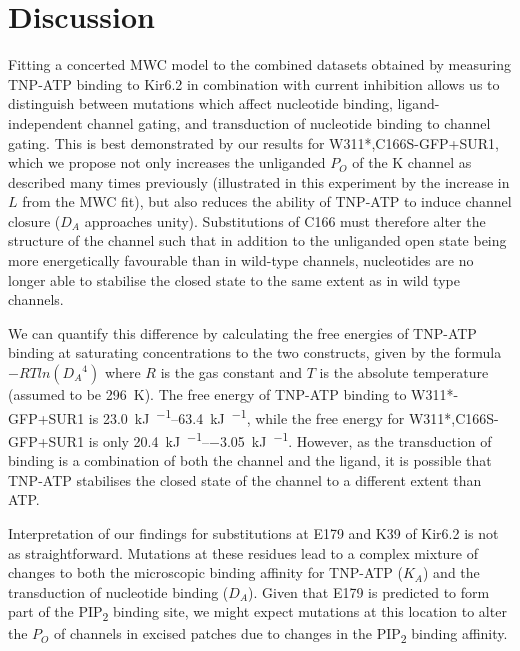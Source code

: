 \section{Discussion}

Fitting a concerted MWC model to the combined datasets obtained by measuring TNP-ATP binding to Kir6.2 in combination with current inhibition allows us to distinguish between mutations which affect nucleotide binding, ligand-independent channel gating, and transduction of nucleotide binding to channel gating.
This is best demonstrated by our results for W311*,C166S-GFP+SUR1, which we propose not only increases the unliganded $P_O$ of the K\ATP{} channel as described many times previously (illustrated in this experiment by the increase in $L$ from the MWC fit), but also reduces the ability of TNP-ATP to induce channel closure ($D_A$ approaches unity).
Substitutions of C166 must therefore alter the structure of the channel such that in addition to the unliganded open state being more energetically favourable than in wild-type channels, nucleotides are no longer able to stabilise the closed state to the same extent as in wild type channels.

We can quantify this difference by calculating the free energies of TNP-ATP binding at saturating concentrations to the two constructs, given by the formula $-RTln({D_A}^4)$ where $R$ is the gas constant and $T$ is the absolute temperature (assumed to be \SI{296}{\kelvin}).
The free energy of TNP-ATP binding to W311*-GFP+SUR1 is \SIrange{23.0}{63.4}{\kilo\joule\per\Molar}, while the free energy for W311*,C166S-GFP+SUR1 is only \SIrange{20.4}{-3.05}{\kilo\joule\per\Molar}.
However, as the transduction of binding is a combination of both the channel and the ligand, it is possible that TNP-ATP stabilises the closed state of the channel to a different extent than ATP.

Interpretation of our findings for substitutions at E179 and K39 of Kir6.2 is not as straightforward.
Mutations at these residues lead to a complex mixture of changes to both the microscopic binding affinity for TNP-ATP ($K_A$) and the transduction of nucleotide binding ($D_A$).
Given that E179 is predicted to form part of the PIP\textsubscript{2} binding site, we might expect mutations at this location to alter the $P_O$ of channels in excised patches due to changes in the PIP\textsubscript{2} binding affinity.